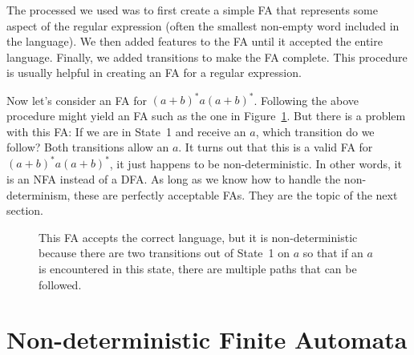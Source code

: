 \documentclass[letterpaper,12pt,openany,reqno]{book}%
\newcommand{\fanonterminalnode}[2] {\node at (#1) (#2) [circle, draw, minimum size=24pt] {#2};}
\newcommand{\fatransition}[3] {\draw [->] (#1) -- (#2) node [midway, above] {#3};}
\newcommand{\falooptop}[2] {\path (#1) edge [loop above] node {#2} ();}
\begin{document}
The processed we used was to first create a simple FA that represents some aspect of the regular expression (often the smallest non-empty word included in the language). We then added features to the FA until it accepted the entire language. Finally, we added transitions to make the FA complete. This procedure is usually helpful in creating an FA for a regular expression.

Now let's consider an FA for $(a+b)^*a(a+b)^*$. Following the above procedure might yield an FA such as the one in Figure~\ref{F.FA_ab_a_ab1}. But there is a problem with this FA: If we are in State~1 and receive an $a$, which transition do we follow? Both transitions allow an $a$. It turns out that this is a valid FA for $(a+b)^*a(a+b)^*$, it just happens to be non-deterministic. In other words, it is an NFA instead of a DFA. As long as we know how to handle the non-determinism, these are perfectly acceptable FAs. They are the topic of the next section.

\begin{figure}[hbt]
\centering
{}
\caption[Attempt at drawing an FA for $(a+b)^*a(a+b)^*$]{This FA accepts the correct language, but it is non-deterministic because there are two transitions out of State~1 on $a$ so that if an $a$ is encountered in this state, there are multiple paths that can be followed.}
  \label{F.FA_ab_a_ab1}
\end{figure}

\section{Non-deterministic Finite Automata}
\end{document}
